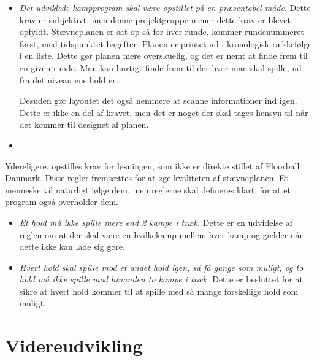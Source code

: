 \begin{itemize}
    \item \textit{Det udviklede kampprogram skal være opstillet på en præsentabel måde}. Dette krav er subjektivt, men denne projektgruppe mener dette krav er blevet opfyldt. Stævneplanen er sat op så for hver runde, kommer rundenummeret først, med tidspunktet bagefter. Planen er printet ud i kronologisk rækkefølge i en liste. Dette gør planen mere overskuelig, og det er nemt at finde frem til en given runde. Man kan hurtigt finde frem til der hvor man skal spille, ud fra det niveau ens hold er. 
    \par
    Desuden gør layoutet det også nemmere at scanne informationer ind igen. Dette er ikke en del af kravet, men det er noget der skal tages hensyn til når det kommer til designet af planen.
    \item 
\end{itemize}

Ydereligere, opstilles krav for løsningen, som ikke er direkte stillet af Floorball Danmark. Disse regler fremsættes for at øge kvaliteten af stævneplanen. Et menneske vil naturligt følge dem, men reglerne skal defineres klart, for at et program også overholder dem.
\begin{itemize}
    \item \textit{Et hold må ikke spille mere end 2 kampe i træk.} Dette er en udvidelse af reglen om at der skal være en hvilkekamp mellem hver kamp og gælder når dette ikke kan lade sig gøre. 
    \item \textit{Hvert hold skal spille mod et andet hold igen, så få gange som muligt, og to hold må ikke spille mod hinanden to kampe i træk.} Dette er besluttet for at sikre at hvert hold kommer til at spille med så mange forskellige hold som muligt.
\end{itemize}

\section{Videreudvikling}

